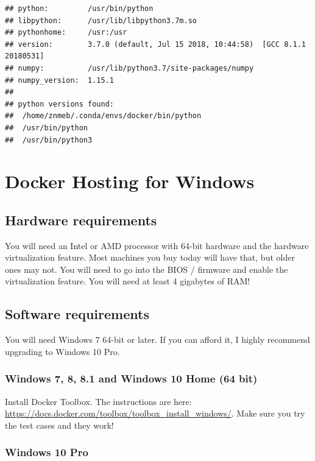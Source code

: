 \documentclass[]{book}
\theoremstyle{definition}
\theoremstyle{definition}
\theoremstyle{definition}
\theoremstyle{remark}
\begin{document}
\begin{verbatim}
## python:         /usr/bin/python
## libpython:      /usr/lib/libpython3.7m.so
## pythonhome:     /usr:/usr
## version:        3.7.0 (default, Jul 15 2018, 10:44:58)  [GCC 8.1.1 20180531]
## numpy:          /usr/lib/python3.7/site-packages/numpy
## numpy_version:  1.15.1
## 
## python versions found: 
##  /home/znmeb/.conda/envs/docker/bin/python
##  /usr/bin/python
##  /usr/bin/python3
\end{verbatim}

\hypertarget{docker-hosting-for-windows}{%
\chapter{Docker Hosting for Windows}\label{docker-hosting-for-windows}}

\hypertarget{hardware-requirements}{%
\section{Hardware requirements}\label{hardware-requirements}}

You will need an Intel or AMD processor with 64-bit hardware and the
hardware virtualization feature. Most machines you buy today will have
that, but older ones may not. You will need to go into the BIOS /
firmware and enable the virtualization feature. You will need at least 4
gigabytes of RAM!

\hypertarget{software-requirements}{%
\section{Software requirements}\label{software-requirements}}

You will need Windows 7 64-bit or later. If you can afford it, I highly
recommend upgrading to Windows 10 Pro.

\hypertarget{windows-7-8-8.1-and-windows-10-home-64-bit}{%
\subsection{Windows 7, 8, 8.1 and Windows 10 Home (64
bit)}\label{windows-7-8-8.1-and-windows-10-home-64-bit}}

Install Docker Toolbox. The instructions are here:
\url{https://docs.docker.com/toolbox/toolbox_install_windows/}. Make
sure you try the test cases and they work!

\hypertarget{windows-10-pro}{%
\subsection{Windows 10 Pro}\label{windows-10-pro}}
\end{document}
